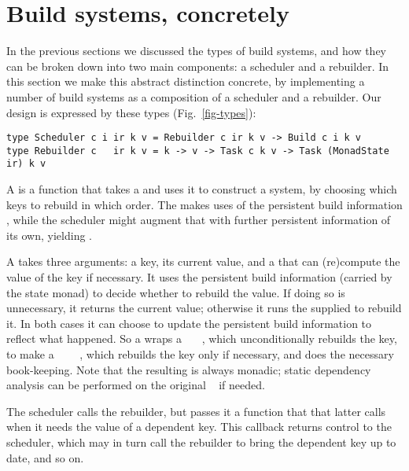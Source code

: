 \section{Build systems, concretely}\label{sec-implementations}

In the previous sections we discussed the types of build systems, and how they
can be broken down into two main components: a scheduler and a rebuilder.
In this section we make this abstract distinction concrete, by
implementing a number of build systems as a composition of a scheduler
and a rebuilder.  Our design is expressed by these types (Fig.~\ref{fig-types}):

\vspace{0.5mm}
\begin{verbatim}
type Scheduler c i ir k v = Rebuilder c ir k v -> Build c i k v
type Rebuilder c   ir k v = k -> v -> Task c k v -> Task (MonadState ir) k v
\end{verbatim}
\vspace{0.5mm}

\noindent
A  is a function that takes a  and uses
it to construct a  system, by choosing which keys to rebuild in which
order. The  makes uses of the persistent build information
, while the scheduler might augment that with further persistent
information of its own, yielding .

A  takes three arguments: a key, its current value, and a
 that can (re)compute the value of the key if necessary. It uses the
persistent build information  (carried by the state monad) to decide
whether to rebuild the value. If doing so is unnecessary, it returns the current
value; otherwise it runs the supplied  to rebuild it. In both cases it
can choose to update the persistent build information  to reflect what
happened. So a  wraps a ~~~, which
unconditionally rebuilds the key, to make a
~~~~, which rebuilds the key only
if necessary, and does the necessary book-keeping. Note that the resulting
 is always monadic; static dependency analysis can be performed on the
original ~ if needed.

The scheduler calls the rebuilder, but passes it a  function
that that latter calls when it needs the value of a dependent key.  This
callback returns control to the scheduler, which may in turn call the
rebuilder to bring the dependent key up to date, and so on.

